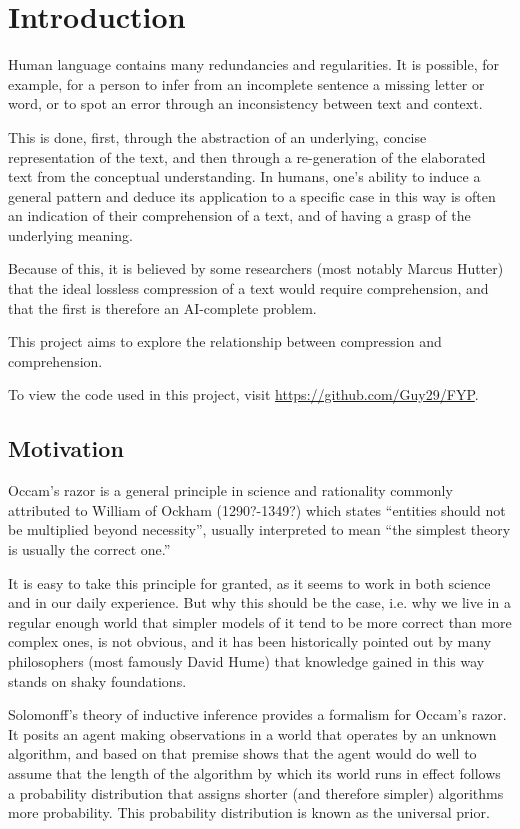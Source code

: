 \chapter{Introduction}

Human language contains many redundancies and regularities. It is possible, for example, for a person to infer from an incomplete sentence a missing letter or word, or to spot an error through an inconsistency between text and context.

This is done, first, through the abstraction of an underlying, concise representation of the text, and then through a re-generation of the elaborated text from the conceptual understanding. In humans, one's ability to induce a general pattern and deduce its application to a specific case in this way is often an indication of their comprehension of a text, and of having a grasp of the underlying meaning.

Because of this, it is believed by some researchers (most notably Marcus Hutter) that the ideal lossless compression of a text would require comprehension, and that the first is therefore an AI-complete problem.

This project aims to explore the relationship between compression and comprehension.

To view the code used in this project, visit \url{https://github.com/Guy29/FYP}.

\section{Motivation}
\label{subsec:motivation}

Occam’s razor is a general principle in science and rationality commonly attributed to William of Ockham (1290?-1349?) which states “entities should not be multiplied beyond necessity”, usually interpreted to mean “the simplest theory is usually the correct one.”

It is easy to take this principle for granted, as it seems to work in both science and in our daily experience. But why this should be the case, i.e. why we live in a regular enough world that simpler models of it tend to be more correct than more complex ones, is not obvious, and it has been historically pointed out by many philosophers (most famously David Hume) that knowledge gained in this way stands on shaky foundations. \autocite{Henderson2018}

Solomonff’s theory of inductive inference provides a formalism for Occam’s razor. It posits an agent making observations in a world that operates by an unknown algorithm, and based on that premise shows that the agent would do well to assume that the length of the algorithm by which its world runs in effect follows a probability distribution that assigns shorter (and therefore simpler) algorithms more probability. This probability distribution is known as the universal prior.

